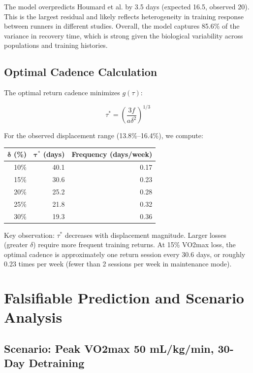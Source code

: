 \documentclass[12pt,a4paper]{article}
\begin{document}
The model overpredicts Houmard et al. by 3.5 days (expected 16.5, observed 20). This is the largest residual and likely reflects heterogeneity in training response between runners in different studies. Overall, the model captures 85.6\% of the variance in recovery time, which is strong given the biological variability across populations and training histories.

\subsection{Optimal Cadence Calculation}

The optimal return cadence minimizes $g(\tau)$:

\begin{equation}
\tau^* = \left(\frac{3f}{a\delta^2}\right)^{1/3}
\end{equation}

For the observed displacement range (13.8\%--16.4\%), we compute:

\begin{center}
\begin{tabular}{r r r}
\toprule
$\boldsymbol{\delta}$ (\%) & $\boldsymbol{\tau^*}$ (days) & Frequency (days/week) \\
\midrule
10\% & 40.1 & 0.17 \\
15\% & 30.6 & 0.23 \\
20\% & 25.2 & 0.28 \\
25\% & 21.8 & 0.32 \\
30\% & 19.3 & 0.36 \\
\bottomrule
\end{tabular}
\end{center}

Key observation: $\tau^*$ decreases with displacement magnitude. Larger losses (greater $\delta$) require more frequent training returns. At 15\% VO2max loss, the optimal cadence is approximately one return session every 30.6 days, or roughly 0.23 times per week (fewer than 2 sessions per week in maintenance mode).

\section{Falsifiable Prediction and Scenario Analysis}

\subsection{Scenario: Peak VO2max 50 mL/kg/min, 30-Day Detraining}
\end{document}
